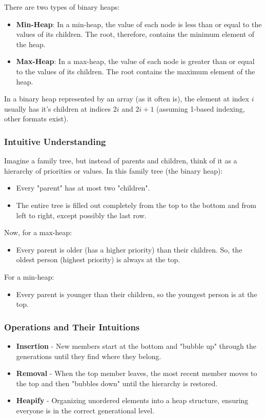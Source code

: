 \documentclass{article}
\begin{document}
There are two types of binary heaps:
\begin{itemize}
    \item \textbf{Min-Heap}: In a min-heap, the value of each node is less than or equal to the values of its children. The root, therefore, contains the minimum element of the heap.
    \item \textbf{Max-Heap}: In a max-heap, the value of each node is greater than or equal to the values of its children. The root contains the maximum element of the heap.
\end{itemize}

In a binary heap represented by an array (as it often is), the element at index $i$ usually has it's children at indices $2i$ and $2i+1$ (assuming 1-based indexing, other formats exist).

\subsubsection*{Intuitive Understanding}

Imagine a family tree, but instead of parents and children, think of it as a hierarchy of priorities or values. In this family tree (the binary heap):
\begin{itemize}
    \item Every "parent" has at most two "children".
    \item The entire tree is filled out completely from the top to the bottom and from left to right, except possibly the last row.
\end{itemize}

Now, for a max-heap:
\begin{itemize}
    \item Every parent is older (has a higher priority) than their children. So, the oldest person (highest priority) is always at the top.
\end{itemize}

For a min-heap:
\begin{itemize}
    \item Every parent is younger than their children, so the youngest person is at the top.
\end{itemize}

\subsubsection*{Operations and Their Intuitions}

\begin{itemize}
    \item \textbf{Insertion} - New members start at the bottom and "bubble up" through the generations until they find where they belong.
    \item \textbf{Removal} - When the top member leaves, the most recent member moves to the top and then "bubbles down" until the hierarchy is restored.
    \item \textbf{Heapify} - Organizing unordered elements into a heap structure, ensuring everyone is in the correct generational level.
\end{itemize}
\end{document}
